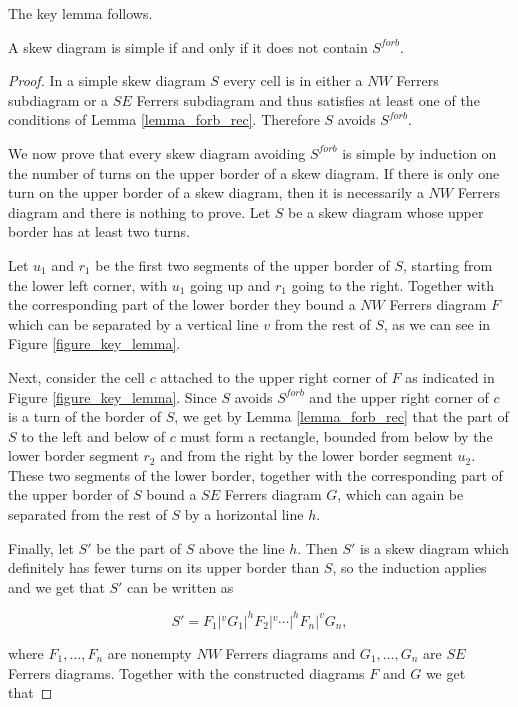 The key lemma follows.

\begin{lemma} \label{lemma_key}
A skew diagram is simple if and only if it does not contain $S^{forb}$.
\end{lemma}
\begin{proof}
In a simple skew diagram $S$ every cell is in either a $NW$ Ferrers subdiagram or a $SE$ Ferrers subdiagram and thus satisfies
at least one of the conditions
of Lemma \ref{lemma_forb_rec}. Therefore $S$ avoids $S^{forb}$. 

We now prove that every skew diagram avoiding $S^{forb}$ is simple by induction on the number of turns on the upper border of a skew diagram. 
If there is only one turn on the upper border of a skew diagram, then it is necessarily a $NW$ Ferrers diagram and there is nothing to prove.
Let $S$ be a skew diagram whose upper border has at least two turns.

Let $u_1$ and $r_1$ be the first two segments of the upper border of $S$, starting from the lower left corner, with $u_1$ going up
and $r_1$ going to the right. Together with the corresponding part of the lower border they bound a $NW$ Ferrers diagram
$F$ which can be separated by a vertical line $v$ from the rest of $S$, as we can see in Figure \ref{figure_key_lemma}.

Next, consider the cell $c$ attached to the upper right corner of $F$ as indicated in Figure \ref{figure_key_lemma}.
Since $S$ avoids $S^{forb}$ and the upper right corner of $c$ is a turn of the border of $S$, we get by Lemma \ref{lemma_forb_rec}
that the part of $S$ to the left and below of $c$ must form a rectangle, bounded from below by the lower border segment $r_2$
and from the right by the lower border segment $u_2$. These two segments of the lower border, together with
the corresponding part of the upper border of $S$ bound a $SE$ Ferrers diagram $G$, which can again be separated from the 
rest of $S$ by a horizontal line $h$.

Finally, let $S'$ be the part of $S$ above the line $h$. Then $S'$ is a skew diagram which definitely has fewer turns
on its upper border than $S$, so the induction applies and we get that $S'$ can be written as

$$S' = F_1 |^v G_1 |^h F_2 |^v \cdots |^h F_n |^v G_n,$$

where $F_1, \ldots, F_n$ are nonempty $NW$ Ferrers diagrams and $G_1, \ldots, G_n$ are $SE$ Ferrers diagrams. Together
with the constructed diagrams $F$ and $G$ we get that


\end{proof}

